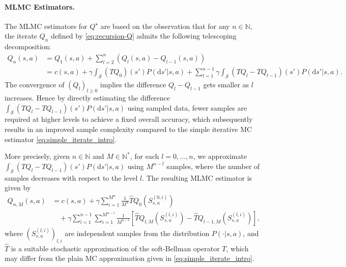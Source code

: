 \documentclass[11pt]{article}
\numberwithin{equation}{section}
\theoremstyle{definition}
\theoremstyle{remark}
\def\cS{\mathcal{S}}
\def\d{{\mathrm{d}}}
\def\N{{\mathbb{N}}}
\begin{document}
 

\paragraph{MLMC Estimators.}

The MLMC estimators for $Q^\star$ are based on 
the observation that   for any $n\in \N$,
  the iterate  $Q_n$ defined by \eqref{eq:recursion-Q} admits     the following telescoping decomposition:  
$$
\begin{aligned}
Q _n(s,a) &= Q_1(s,a) + \sum_{l = 2}^{n} (Q_{l}(s,a) - Q_{l-1}(s,a)) \\
    &= c(s,a)+\gamma \int_\cS (T Q_0)(s') P(\d s'|s,a)+ \sum_{l = 1}^{n - 1} \gamma \int_\cS 
      (T Q_{l} -T Q_{l-1})(s') P(\d s'|s,a).
    \end{aligned}
$$ 
The  convergence of $(Q_l)_{l\ge 0}$
implies 
the difference $Q_{l} - Q_{l - 1}$ gets smaller as $l$ increases.
Hence by directly
estimating the difference $\int_\cS 
(T Q_{l} -T Q_{l-1})(s') P(\d s'|s,a) $ 
using sampled data,
 fewer samples are required at higher levels to achieve a fixed  overall accuracy,
 which subsequently  results in an improved sample complexity compared to the simple iterative MC estimator \eqref{eq:simple_iterate_intro}.  


More precisely,     given $n\in \N$  and $M \in \N^*$, 
for each  $l = 0,\ldots, n$,
we approximate 
  $\int_\cS 
(T Q_{l} -T Q_{l-1})(s') P(\d s'|s,a) $
using  $M^{n-l}$ samples, 
where the number of samples decreases with respect to the level
  $l$. The resulting  MLMC estimator is given by
\begin{equation}
    \label{eq:MLMC-sketch}
    \begin{aligned}
        Q_{n, M} (s,a) & = c(s,a) + \gamma \sum_{i = 1}^{M^n} \frac{1}{M^n} \hat{T}Q_{0}\left(S^{(0,i)}_{s,a}\right)                                 \\
    &
    \quad + \gamma \sum_{l = 1}^{n-1}\sum_{i = 1}^{M^{n-l}}\frac{1}{M^{n-l}}\left[ \hat{T}Q_{ l, M} \left( S^{(l,i)}_{s,a} \right) - \hat{T} Q_{l - 1, M}\left(S^{(l,i)}_{s,a}\right) \right],
    \end{aligned}
\end{equation}
where $(S ^{(l,i)}_{s,a}) _{l,i}$ are independent samples from the distribution $P(\cdot | s, a)$, and $\hat{T}$ is a suitable stochastic approximation of the soft-Bellman operator $T$, 
which may differ from the plain MC approximation given in  \eqref{eq:simple_iterate_intro}.
\end{document}
